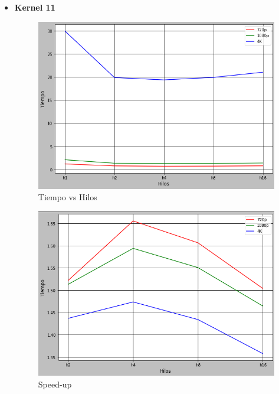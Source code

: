 \documentclass[a4paper,10pt]{IEEEtran}
\begin{document}
\begin{itemize}
    \item \textbf{Kernel 11} 
        \begin{figure}[H]
            \centering
            \includegraphics[scale = 0.3]{images/kB.png}
            \caption{Tiempo vs Hilos}
            \label{f04}
        \end{figure}{}
        
        \begin{figure}[H]
            \centering
            \includegraphics[scale = 0.3]{images/kBs.png}
            \caption{Speed-up}
            \label{f04a}
        \end{figure}{}
        

\end{itemize}
\end{document}
